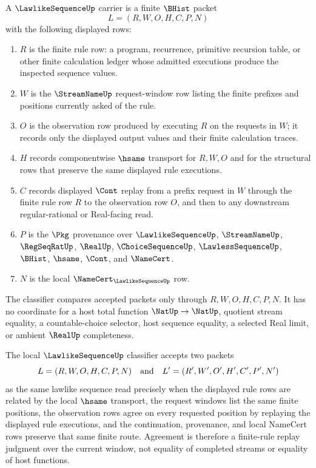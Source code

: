 \begin{definition}
\label{def:lawlike-sequence-carrier}
A $\LawlikeSequenceUp$ carrier is a finite $\BHist$ packet
$$
L=(R,W,O,H,C,P,N)
$$
with the following displayed rows:
\begin{enumerate}
\item $R$ is the finite rule row: a program, recurrence, primitive recursion table, or other finite calculation ledger whose admitted executions produce the inspected sequence values.
\item $W$ is the $\StreamNameUp$ request-window row listing the finite prefixes and positions currently asked of the rule.
\item $O$ is the observation row produced by executing $R$ on the requests in $W$; it records only the displayed output values and their finite calculation traces.
\item $H$ records componentwise $\hsame$ transport for $R,W,O$ and for the structural rows that preserve the same displayed rule executions.
\item $C$ records displayed $\Cont$ replay from a prefix request in $W$ through the finite rule row $R$ to the observation row $O$, and then to any downstream regular-rational or Real-facing read.
\item $P$ is the $\Pkg$ provenance over $\LawlikeSequenceUp$, $\StreamNameUp$, $\RegSeqRatUp$, $\RealUp$, $\ChoiceSequenceUp$, $\LawlessSequenceUp$, $\BHist$, $\hsame$, $\Cont$, and $\NameCert$.
\item $N$ is the local $\NameCert_{\LawlikeSequenceUp}$ row.
\end{enumerate}
The classifier compares accepted packets only through $R,W,O,H,C,P,N$. It has no coordinate for a host total function $\NatUp \to \NatUp$, quotient stream equality, a countable-choice selector, host sequence equality, a selected Real limit, or ambient $\RealUp$ completeness.
\end{definition}

\begin{definition}
\label{def:lawlike-sequence-classifier}
The local $\LawlikeSequenceUp$ classifier accepts two packets
$$
L=(R,W,O,H,C,P,N)
\quad\hbox{and}\quad
L'=(R',W',O',H',C',P',N')
$$
as the same lawlike sequence read precisely when the displayed rule rows are related by the local $\hsame$ transport, the request windows list the same finite positions, the observation rows agree on every requested position by replaying the displayed rule executions, and the continuation, provenance, and local NameCert rows preserve that same finite route. Agreement is therefore a finite-rule replay judgment over the current window, not equality of completed streams or equality of host functions.
\end{definition}

